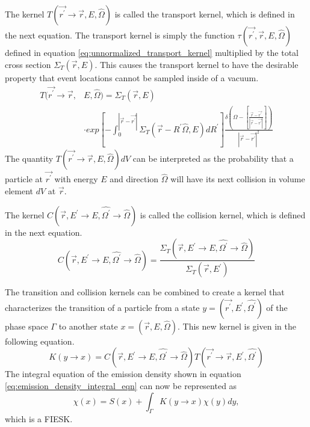 The kernel $T(\vec{r^{'}} \to \vec{r},E,\hat{\Omega})$ is called the transport
kernel, which is defined in the next equation. The transport kernel is simply
the function $\tau(\vec{r^{'}},\vec{r},E,\hat{\Omega})$ defined in equation 
\ref{eq:unnormalized_transport_kernel} multiplied by the total cross section
$\Sigma_T(\vec{r},E)$. This causes the transport kernel to have the desirable
property that event locations cannot be sampled inside of a vacuum.
\begin{equation}
  \begin{split}
    T(\vec{r^{'}} \to \vec{r},&E,\hat{\Omega}) = \Sigma_T(\vec{r},E) \\
    &\cdot exp\left[-\int_0^{|\vec{r} - \vec{r^{'}}|} 
      \Sigma_T(\vec{r}-R^{'}\hat{\Omega},E)dR^{'} \right] 
    \frac{\delta \left(\Omega - \left[\frac{\vec{r} - \vec{r^{'}}}
        {|\vec{r} - \vec{r^{'}}|}\right]\right)}
    {|\vec{r} - \vec{r^{'}}|^2} 
  \end{split}
\end{equation}
The quantity $T(\vec{r^{'}} \to \vec{r},E,\hat{\Omega})dV$ can be interpreted
as the probability that a particle at $\vec{r^{'}}$ with energy $E$ and 
direction $\hat{\Omega}$ will have its next collision in volume element $dV$
at $\vec{r}$.  

The kernel $C(\vec{r},E^{'} \to E,\hat{\Omega^{'}} \to \hat{\Omega})$ is called
the collision kernel, which is defined in the next equation.
\begin{equation}
  C(\vec{r},E^{'} \to E,\hat{\Omega^{'}} \to \hat{\Omega}) = 
  \frac{\Sigma_T(\vec{r},E^{'} \to E,\hat{\Omega^{'}} \to \hat{\Omega})}
       {\Sigma_T(\vec{r},E^{'})}
\end{equation}

The transition and collision kernels can be combined to create a kernel that
characterizes the transition of a particle from a state 
$y = (\vec{r^{'}},E^{'},\hat{\Omega^{'}})$ of the phase space $\Gamma$ to another 
state $x = (\vec{r},E,\hat{\Omega})$. This new kernel is given in the following 
equation.
\begin{equation}
  K(y \to x) =
  C(\vec{r},E^{'} \to E,\hat{\Omega^{'}} \to \hat{\Omega})
    T(\vec{r^{'}} \to \vec{r},E^{'},\hat{\Omega^{'}})
\end{equation}
The integral equation of the emission density shown in equation 
\ref{eq:emission_density_integral_eqn} can now be represented as
\begin{equation*}
  \chi(x) = S(x) + \int_{\Gamma} K(y \to x)\chi(y)dy,
\end{equation*}
which is a FIESK. 

